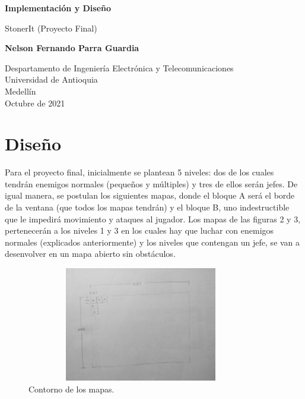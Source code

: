 \documentclass{article}
\begin{document}
\begin{titlepage}
    \begin{center}
        \vspace*{1cm}
            
        \Huge
        \textbf{Implementación y Diseño}
            
        \vspace{0.5cm}
        \LARGE
        StonerIt (Proyecto Final)
            
        \vspace{1.5cm}
            
        \textbf{Nelson Fernando Parra Guardia}
            
        \vfill
            
        \vspace{0.8cm}
            
        \Large
        Despartamento de Ingeniería Electrónica y Telecomunicaciones\\
        Universidad de Antioquia\\
        Medellín\\
        Octubre de 2021
            
    \end{center}
\end{titlepage}

\newpage
\section{Diseño}
Para el proyecto final, inicialmente se plantean 5 niveles: dos de los cuales tendrán enemigos normales (pequeños y múltiples) y tres de ellos serán jefes. De igual manera, se postulan los siguientes mapas, donde el bloque A será el borde de la ventana (que todos los mapas tendrán) y el bloque B, uno indestructible que le impedirá movimiento y ataques al jugador. Los mapas de las figuras 2 y 3, pertenecerán a los niveles 1 y 3 en los cuales hay que luchar con enemigos normales (explicados anteriormente) y los niveles que contengan un jefe, se van a desenvolver en un mapa abierto sin obstáculos.

\begin{figure}[h]
\includegraphics[width=10cm, height=5cm]{imagenes/bordes.jpg}
\centering
\caption{Contorno de los mapas.}
\label{fig:diagram}
\end{figure}
\end{document}
